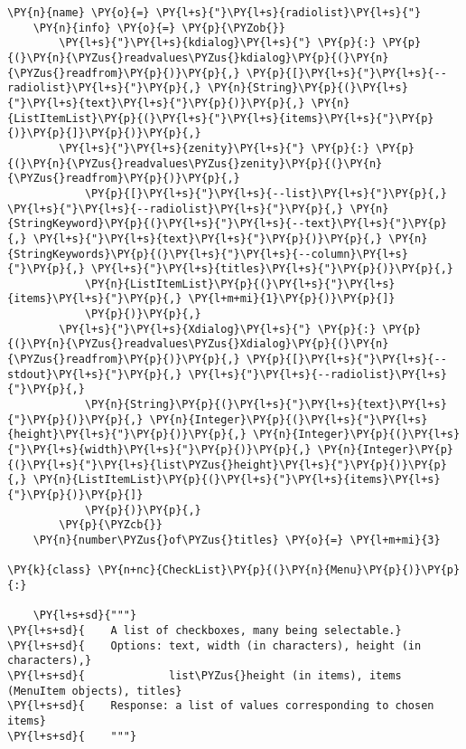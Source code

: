 \begin{Verbatim}[commandchars=\\\{\}]
    \PY{n}{name} \PY{o}{=} \PY{l+s}{"}\PY{l+s}{radiolist}\PY{l+s}{"}
    \PY{n}{info} \PY{o}{=} \PY{p}{\PYZob{}}
        \PY{l+s}{"}\PY{l+s}{kdialog}\PY{l+s}{"} \PY{p}{:} \PY{p}{(}\PY{n}{\PYZus{}readvalues\PYZus{}kdialog}\PY{p}{(}\PY{n}{\PYZus{}readfrom}\PY{p}{)}\PY{p}{,} \PY{p}{[}\PY{l+s}{"}\PY{l+s}{--radiolist}\PY{l+s}{"}\PY{p}{,} \PY{n}{String}\PY{p}{(}\PY{l+s}{"}\PY{l+s}{text}\PY{l+s}{"}\PY{p}{)}\PY{p}{,} \PY{n}{ListItemList}\PY{p}{(}\PY{l+s}{"}\PY{l+s}{items}\PY{l+s}{"}\PY{p}{)}\PY{p}{]}\PY{p}{)}\PY{p}{,}
        \PY{l+s}{"}\PY{l+s}{zenity}\PY{l+s}{"} \PY{p}{:} \PY{p}{(}\PY{n}{\PYZus{}readvalues\PYZus{}zenity}\PY{p}{(}\PY{n}{\PYZus{}readfrom}\PY{p}{)}\PY{p}{,}
            \PY{p}{[}\PY{l+s}{"}\PY{l+s}{--list}\PY{l+s}{"}\PY{p}{,} \PY{l+s}{"}\PY{l+s}{--radiolist}\PY{l+s}{"}\PY{p}{,} \PY{n}{StringKeyword}\PY{p}{(}\PY{l+s}{"}\PY{l+s}{--text}\PY{l+s}{"}\PY{p}{,} \PY{l+s}{"}\PY{l+s}{text}\PY{l+s}{"}\PY{p}{)}\PY{p}{,} \PY{n}{StringKeywords}\PY{p}{(}\PY{l+s}{"}\PY{l+s}{--column}\PY{l+s}{"}\PY{p}{,} \PY{l+s}{"}\PY{l+s}{titles}\PY{l+s}{"}\PY{p}{)}\PY{p}{,}
            \PY{n}{ListItemList}\PY{p}{(}\PY{l+s}{"}\PY{l+s}{items}\PY{l+s}{"}\PY{p}{,} \PY{l+m+mi}{1}\PY{p}{)}\PY{p}{]}
            \PY{p}{)}\PY{p}{,}
        \PY{l+s}{"}\PY{l+s}{Xdialog}\PY{l+s}{"} \PY{p}{:} \PY{p}{(}\PY{n}{\PYZus{}readvalues\PYZus{}Xdialog}\PY{p}{(}\PY{n}{\PYZus{}readfrom}\PY{p}{)}\PY{p}{,} \PY{p}{[}\PY{l+s}{"}\PY{l+s}{--stdout}\PY{l+s}{"}\PY{p}{,} \PY{l+s}{"}\PY{l+s}{--radiolist}\PY{l+s}{"}\PY{p}{,}
            \PY{n}{String}\PY{p}{(}\PY{l+s}{"}\PY{l+s}{text}\PY{l+s}{"}\PY{p}{)}\PY{p}{,} \PY{n}{Integer}\PY{p}{(}\PY{l+s}{"}\PY{l+s}{height}\PY{l+s}{"}\PY{p}{)}\PY{p}{,} \PY{n}{Integer}\PY{p}{(}\PY{l+s}{"}\PY{l+s}{width}\PY{l+s}{"}\PY{p}{)}\PY{p}{,} \PY{n}{Integer}\PY{p}{(}\PY{l+s}{"}\PY{l+s}{list\PYZus{}height}\PY{l+s}{"}\PY{p}{)}\PY{p}{,} \PY{n}{ListItemList}\PY{p}{(}\PY{l+s}{"}\PY{l+s}{items}\PY{l+s}{"}\PY{p}{)}\PY{p}{]}
            \PY{p}{)}\PY{p}{,}
        \PY{p}{\PYZcb{}}
    \PY{n}{number\PYZus{}of\PYZus{}titles} \PY{o}{=} \PY{l+m+mi}{3}

\PY{k}{class} \PY{n+nc}{CheckList}\PY{p}{(}\PY{n}{Menu}\PY{p}{)}\PY{p}{:}

    \PY{l+s+sd}{"""}
\PY{l+s+sd}{    A list of checkboxes, many being selectable.}
\PY{l+s+sd}{    Options: text, width (in characters), height (in characters),}
\PY{l+s+sd}{             list\PYZus{}height (in items), items (MenuItem objects), titles}
\PY{l+s+sd}{    Response: a list of values corresponding to chosen items}
\PY{l+s+sd}{    """}


\end{Verbatim}
